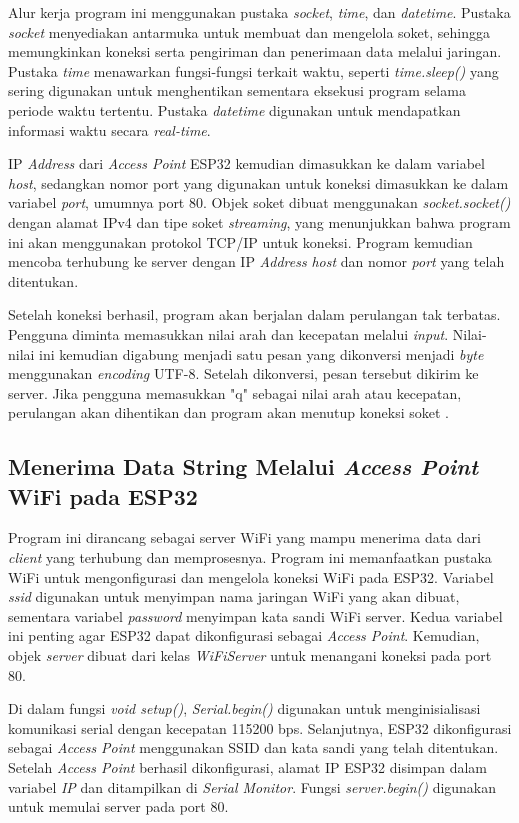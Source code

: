 Alur kerja program ini menggunakan pustaka \emph{socket}, \emph{time}, dan \emph{datetime}. Pustaka \emph{socket} menyediakan antarmuka untuk membuat dan mengelola soket, sehingga memungkinkan koneksi serta pengiriman dan penerimaan data melalui jaringan. Pustaka \emph{time} menawarkan fungsi-fungsi terkait waktu, seperti \emph{time.sleep()} yang sering digunakan untuk menghentikan sementara eksekusi program selama periode waktu tertentu. Pustaka \emph{datetime} digunakan untuk mendapatkan informasi waktu secara \emph{real-time}.

IP \emph{Address} dari \emph{Access Point} ESP32 kemudian dimasukkan ke dalam variabel \emph{host}, sedangkan nomor port yang digunakan untuk koneksi dimasukkan ke dalam variabel \emph{port}, umumnya port 80. Objek soket dibuat menggunakan \emph{socket.socket()} dengan alamat IPv4 dan tipe soket \emph{streaming}, yang menunjukkan bahwa program ini akan menggunakan protokol TCP/IP untuk koneksi. Program kemudian mencoba terhubung ke server dengan IP \emph{Address} \emph{host} dan nomor \emph{port} yang telah ditentukan.

Setelah koneksi berhasil, program akan berjalan dalam perulangan tak terbatas. Pengguna diminta memasukkan nilai arah dan kecepatan melalui \emph{input}. Nilai-nilai ini kemudian digabung menjadi satu pesan yang dikonversi menjadi \emph{byte} menggunakan \emph{encoding} UTF-8. Setelah dikonversi, pesan tersebut dikirim ke server. Jika pengguna memasukkan "q" sebagai nilai arah atau kecepatan, perulangan akan dihentikan dan program akan menutup koneksi soket \parencite{ekatama2024perancangan}.

\subsection{Menerima Data String Melalui \emph{Access Point} WiFi pada ESP32}

Program ini dirancang sebagai server WiFi yang mampu menerima data dari \emph{client} yang terhubung dan memprosesnya. Program ini memanfaatkan pustaka WiFi untuk mengonfigurasi dan mengelola koneksi WiFi pada ESP32. Variabel \emph{ssid} digunakan untuk menyimpan nama jaringan WiFi yang akan dibuat, sementara variabel \emph{password} menyimpan kata sandi WiFi server. Kedua variabel ini penting agar ESP32 dapat dikonfigurasi sebagai \emph{Access Point}. Kemudian, objek \emph{server} dibuat dari kelas \emph{WiFiServer} untuk menangani koneksi pada port 80.

Di dalam fungsi \emph{void setup()}, \emph{Serial.begin()} digunakan untuk menginisialisasi komunikasi serial dengan kecepatan 115200 bps. Selanjutnya, ESP32 dikonfigurasi sebagai \emph{Access Point} menggunakan SSID dan kata sandi yang telah ditentukan. Setelah \emph{Access Point} berhasil dikonfigurasi, alamat IP ESP32 disimpan dalam variabel \emph{IP} dan ditampilkan di \emph{Serial Monitor}. Fungsi \emph{server.begin()} digunakan untuk memulai server pada port 80.

